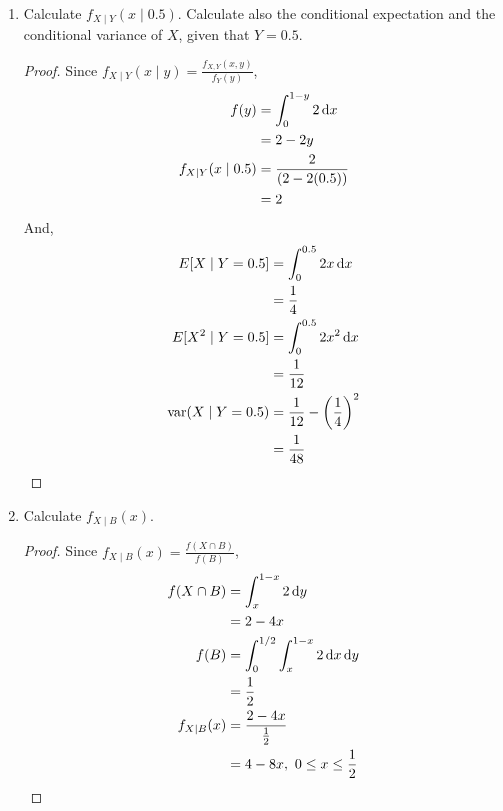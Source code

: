 \documentclass[paper=usletter, fontsize=12pt]{article}
\begin{document}
\begin{enumerate}
\begin{enumerate}
\begin{proof}
            \end{proof}

            \item Calculate $f_{X \mid Y}(x \mid 0.5)$. Calculate also the
            conditional expectation and the conditional variance of $X$, given
            that $Y=0.5$.
            \begin{proof}

                Since $f_{X \mid Y}(x \mid y) = \frac{f_{X,Y}(x,y)}{f_Y(y)}$,
                \begin{align*}
                    f(y) &= \int_{0}^{1-y}2\mathop{}\!\mathrm{d}{x}\\
                    & = 2-2y \\
                    f_{X \mid Y}(x \mid 0.5) & = \frac{2}{(2-2(0.5))} \\
                    & = 2
                \end{align*}
                \endgroup
                And,
                \begin{align*}
                    E[X \mid Y = 0.5] &= \int_{0}^{0.5}2x\mathop{}\!\mathrm{d}{x}\\
                    & = \frac{1}{4} \\
                    E[X^2 \mid Y = 0.5] &= \int_{0}^{0.5}2x^2\mathop{}\!\mathrm{d}{x}\\
                    & = \frac{1}{12} \\
                    \operatorname{var}(X \mid Y = 0.5) & = \frac{1}{12} - \bigg(\frac{1}{4}\bigg)^2\\
                    & = \frac{1}{48} \qedhere
                \end{align*}
                \endgroup

            \end{proof}

            \item Calculate $f_{X \mid B}(x)$.
            \begin{proof}

                Since $f_{X \mid B}(x) = \frac{f(X \cap B)}{f(B)}$,
                \begin{align*}
                    f(X \cap B) & = \int_{x}^{1-x}2\mathop{}\!\mathrm{d}{y} \\
                    & = 2 - 4x \\
                    f(B) & = \int_{0}^{1/2}\int_{x}^{1-x}2\mathop{}\!\mathrm{d}{x}\mathop{}\!\mathrm{d}{y} \\
                    & = \frac{1}{2} \\
                    f_{X \mid B}(x) & = \frac{2 - 4x}{\frac{1}{2}} \\
                    & = 4 - 8x, \ 0 \le x \le \frac{1}{2} \qedhere
                \end{align*}
                \endgroup


\end{proof}
\end{enumerate}
\end{enumerate}
\end{document}
